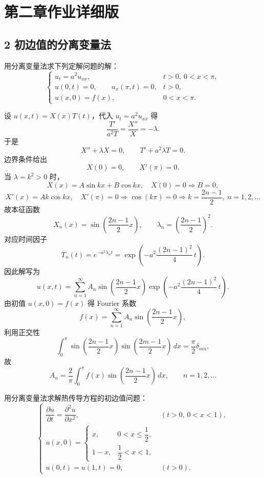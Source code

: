 
\chapter{第二章作业详细版}
\section{2 初边值的分离变量法}
\begin{homework}[1]
用分离变量法求下列定解问题的解：
\[
\begin{cases}
u_t=a^2u_{xx}, & t>0,\ 0<x<\pi,\\[4pt]
u(0,t)=0,\qquad u_x(\pi,t)=0, & t>0,\\[4pt]
u(x,0)=f(x), & 0<x<\pi.
\end{cases}
\]
\end{homework}
\begin{solution}
设 $u(x,t)=X(x)T(t)$，代入 $u_t=a^2u_{xx}$ 得
\[
\frac{T'}{a^2T}=\frac{X''}{X}=-\lambda.
\]
于是
\[
X''+\lambda X=0,\qquad T'+a^2\lambda T=0.
\]
边界条件给出
\[
X(0)=0,\qquad X'(\pi)=0.
\]
当 $\lambda=k^2>0$ 时，
\[
X(x)=A\sin kx+B\cos kx,\quad X(0)=0\Rightarrow B=0,
\]
\[
X'(x)=Ak\cos kx,\quad X'(\pi)=0\Rightarrow \cos(k\pi)=0
\Rightarrow k=\frac{2n-1}{2},\ n=1,2,\dots
\]
故本征函数
\[
X_n(x)=\sin\!\left(\frac{2n-1}{2}x\right),\qquad 
\lambda_n=\left(\frac{2n-1}{2}\right)^2.
\]
对应时间因子
\[
T_n(t)=e^{-a^2\lambda_n t}= \exp\!\left(-a^2\frac{(2n-1)^2}{4}\,t\right).
\]
因此解写为
\[
u(x,t)=\sum_{n=1}^{\infty}A_n
\sin\!\left(\frac{2n-1}{2}x\right)
\exp\!\left(-a^2\frac{(2n-1)^2}{4}\,t\right).
\]
由初值 $u(x,0)=f(x)$ 得 Fourier 系数
\[
f(x)=\sum_{n=1}^{\infty}A_n\sin\!\left(\frac{2n-1}{2}x\right),
\]
利用正交性
\[
\int_0^\pi \sin\!\left(\frac{2n-1}{2}x\right)\sin\!\left(\frac{2m-1}{2}x\right)\,dx
=\frac{\pi}{2}\delta_{mn},
\]
故
\[
A_n=\frac{2}{\pi}\int_0^\pi f(x)\sin\!\left(\frac{2n-1}{2}x\right)\,dx,
\qquad n=1,2,\dots
\]
\end{solution}
\begin{homework}[2]
用分离变量法求解热传导方程的初边值问题：
\[
\begin{cases}
\dfrac{\partial u}{\partial t}
= \dfrac{\partial^2 u}{\partial x^2}, & (t>0,\,0<x<1),\\[6pt]
u(x,0)=
\begin{cases}
x, & 0<x\le\dfrac{1}{2},\\[4pt]
1-x, & \dfrac{1}{2}<x<1,
\end{cases}\\[10pt]
u(0,t)=u(1,t)=0, & (t>0).
\end{cases}
\]
\end{homework}
